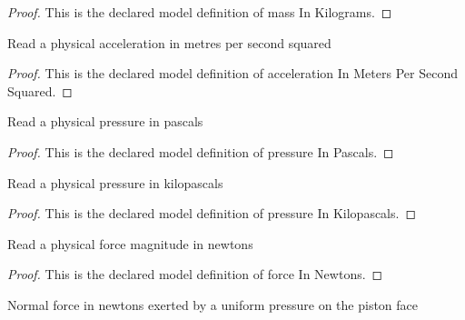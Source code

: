 \begin{proof}
  This is the declared model definition of mass In Kilograms.
\end{proof}
\begin{definition}
  \label{def:physics:phyx-mini-0662:phyxminiproblems-problemphyxmini0662-accelerationinmeterspersecondsquared}
  Read a physical acceleration in metres per second squared
\end{definition}
\begin{proof}
  This is the declared model definition of acceleration In Meters Per Second Squared.
\end{proof}
\begin{definition}
  \label{def:physics:phyx-mini-0662:phyxminiproblems-problemphyxmini0662-pressureinpascals}
  Read a physical pressure in pascals
\end{definition}
\begin{proof}
  This is the declared model definition of pressure In Pascals.
\end{proof}
\begin{definition}
  \label{def:physics:phyx-mini-0662:phyxminiproblems-problemphyxmini0662-pressureinkilopascals}
  Read a physical pressure in kilopascals
\end{definition}
\begin{proof}
  This is the declared model definition of pressure In Kilopascals.
\end{proof}
\begin{definition}
  \label{def:physics:phyx-mini-0662:phyxminiproblems-problemphyxmini0662-forceinnewtons}
  Read a physical force magnitude in newtons
\end{definition}
\begin{proof}
  This is the declared model definition of force In Newtons.
\end{proof}
\begin{definition}
  \label{def:physics:phyx-mini-0662:phyxminiproblems-problemphyxmini0662-pressureforceinnewtons}
  Normal force in newtons exerted by a uniform pressure on the piston face
\end{definition}
